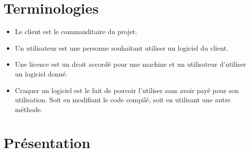 \chapter{Terminologies}

\begin{itemize}
	\item Le client est le commanditaire du projet.
	\item Un utilisateur est une personne souhaitant utiliser un logiciel du client. 
	\item Une licence est un droit accordé pour une machine et un utilisateur d'utiliser un logiciel donné.
	\item Craquer un logiciel est le fait de pouvoir l'utiliser sans avoir payé pour son utilisation. 
	Soit en modifiant le code compilé, soit en utilisant une autre méthode. 
\end{itemize}

\chapter{Présentation}

